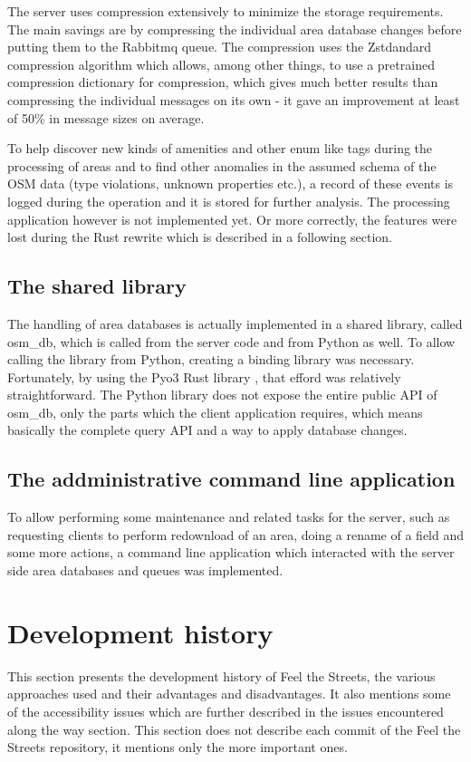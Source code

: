 \documentclass[nolof,digital]{fithesis3}
\begin{document}
The server uses compression extensively to minimize the storage requirements. The main savings are by compressing the individual area database changes before putting them to the Rabbitmq queue. The compression uses the Zstdandard compression algorithm \parencite{zstd} which allows, among other things, to use a pretrained compression dictionary for compression, which gives much better results than compressing the individual messages on its own - it gave an improvement at least of 50\% in message sizes on average.

To help discover new kinds of amenities and other enum like tags during the processing of areas and to find other anomalies in the assumed schema of the OSM data (type violations, unknown properties etc.), a record of these events is logged during the operation and it is stored for further analysis. The processing application however is not implemented yet. Or more correctly, the features were lost during the Rust rewrite which is described in a following section.
\subsection{The shared library}
The handling of area databases is actually implemented in a shared library, called osm\_db, which is called from the server code and from Python as well. To allow calling the library from Python, creating a binding library was necessary. Fortunately, by using the Pyo3 Rust library \parencite{pyo3}, that efford was relatively straightforward. The Python library does not expose the entire public API of osm\_db, only the parts which the client application requires, which means basically the complete query API and a way to apply database changes.
\subsection{The addministrative command line application}
To allow performing some maintenance and related tasks for the server, such as requesting clients to perform redownload of an area, doing a rename of a field and some more actions, a command line application which interacted with the server side area databases and queues was implemented.
\section{Development history}
This section presents the development history of Feel the Streets, the various approaches used and their advantages and disadvantages. It also mentions some of the accessibility issues which are further described in the issues encountered along the way section. This section does not describe each commit of the Feel the Streets repository, it mentions only the more important ones.
\end{document}
